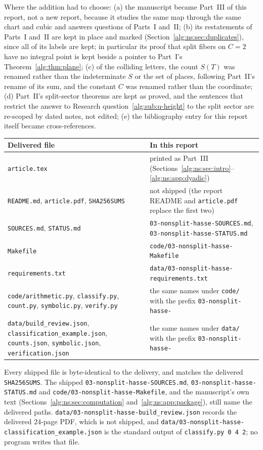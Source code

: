 \documentclass[11pt]{article}
\numberwithin{equation}{section}
\theoremstyle{plain}
\theoremstyle{plain}
\theoremstyle{plain}
\theoremstyle{definition}
\theoremstyle{definition}
\theoremstyle{definition}
\theoremstyle{remark}
\newcommand{\rpath}[1]{\nolinkurl{#1}}
\begin{document}
Where the addition had to choose: (a) the manuscript became Part~III of
this report, not a new report, because it studies the same map through
the same chart and cubic and answers questions of Parts~I and~II;
(b) its restatements of Parts~I and~II are kept in place and marked
(Section~\ref{alg:ns:sec:duplicates}), since all of its labels are kept;
in particular its proof that split fibers on $C=2$ have no integral point
is kept beside a pointer to Part~I's Theorem~\ref{alg:thm:plane};
(c) of the colliding letters, the count $S(T)$ was renamed rather than
the indeterminate $S$ or the set of places, following Part~II's rename of
its sum, and the constant $C$ was renamed rather than the coordinate;
(d) Part~II's split-sector theorems are kept as proved, and the sentences
that restrict the answer to Research question~\ref{alg:sub:q-height} to
the split sector are re-scoped by dated notes, not edited; (e) the
bibliography entry for this report itself became cross-references.

\begin{center}\small
\begin{tabular}{>{\raggedright}p{}>{\raggedright\arraybackslash}p{}}
\toprule
Delivered file & In this report\\
\midrule
\texttt{article.tex} & printed as Part~III
(Sections~\ref{alg:ns:sec:intro}--\ref{alg:ns:app:dyadic})\\
\texttt{README.md}, \texttt{article.pdf}, \texttt{SHA256SUMS} & not
shipped (the report README and \rpath{article.pdf} replace the first
two)\\
\texttt{SOURCES.md}, \texttt{STATUS.md} &
\rpath{03-nonsplit-hasse-SOURCES.md}, \rpath{03-nonsplit-hasse-STATUS.md}\\
\texttt{Makefile} & \rpath{code/03-nonsplit-hasse-Makefile}\\
\texttt{requirements.txt} & \rpath{data/03-nonsplit-hasse-requirements.txt}\\
\texttt{code/arithmetic.py}, \texttt{classify.py}, \texttt{count.py},
\texttt{symbolic.py}, \texttt{verify.py} & the same names under
\rpath{code/} with the prefix \texttt{03-nonsplit-hasse-}\\
\texttt{data/build\_review.json}, \texttt{classification\_example.json},
\texttt{counts.json}, \texttt{symbolic.json}, \texttt{verification.json} &
the same names under \rpath{data/} with the prefix
\texttt{03-nonsplit-hasse-}\\
\bottomrule
\end{tabular}
\end{center}
Every shipped file is byte-identical to the delivery, and matches the
delivered \texttt{SHA256SUMS}. The shipped
\rpath{03-nonsplit-hasse-SOURCES.md}, \rpath{03-nonsplit-hasse-STATUS.md}
and \rpath{code/03-nonsplit-hasse-Makefile}, and the manuscript's own text
(Sections~\ref{alg:ns:sec:computation} and~\ref{alg:ns:app:package}),
still name the delivered paths. \rpath{data/03-nonsplit-hasse-build_review.json}
records the delivered 24-page PDF, which is not shipped, and
\rpath{data/03-nonsplit-hasse-classification_example.json} is the
standard output of \texttt{classify.py 0 4 2}; no program writes that
file.
\end{document}

